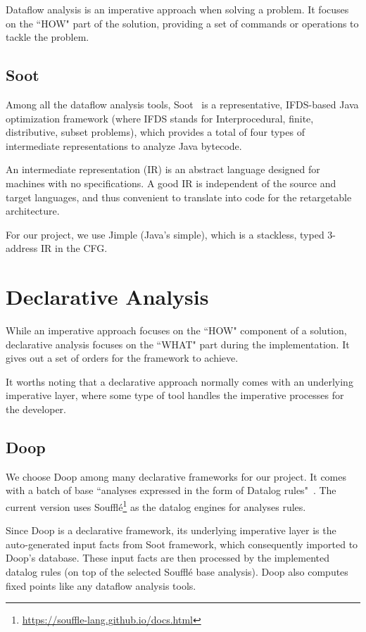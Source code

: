 Dataflow analysis is an imperative approach when solving a problem. It focuses on the ``HOW" part of the solution, providing a set of commands or operations to tackle the problem.

\subsection{Soot}

Among all the dataflow analysis tools, Soot~\cite{Vallee-Rai:1999:SJB:781995.782008} is a representative, IFDS-based Java optimization framework (where IFDS stands for Interprocedural, finite, distributive, subset problems), which provides a total of four types of intermediate representations to analyze Java bytecode. 

An intermediate representation (IR) is an abstract language designed for machines with no specifications. A good IR is independent of the source and target languages, and thus convenient to translate into code for the retargetable architecture.

For our project, we use Jimple (Java's simple), which is a stackless, typed 3-address IR in the CFG.

\section{Declarative Analysis}

While an imperative approach focuses on the ``HOW" component of a solution, declarative analysis focuses on the ``WHAT" part during the implementation. It gives out a set of orders for the framework to achieve.

It worths noting that a declarative approach normally comes with an underlying imperative layer, where some type of tool handles the imperative processes for the developer.

\subsection{Doop}

We choose Doop among many declarative frameworks for our project. It comes with a batch of base ``analyses expressed in the form of Datalog rules"~\cite{doop-repo}. The current version uses Soufflé\footnote{\url{https://souffle-lang.github.io/docs.html}} as the datalog engines for analyses rules.

Since Doop is a declarative framework, its underlying imperative layer is the auto-generated input facts from Soot framework, which consequently imported to Doop's database. These input facts are then processed by the implemented datalog rules (on top of the selected Soufflé base analysis). Doop also computes fixed points like any dataflow analysis tools.


